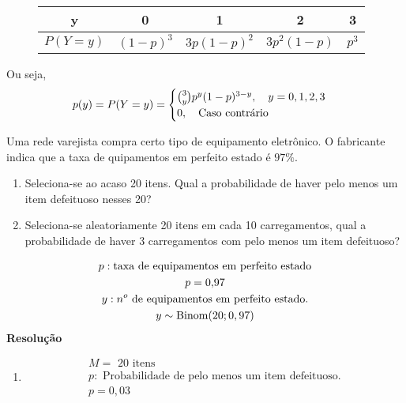 \begin{description}
\begin{example}
     \begin{figure}[H]
       \centering
       \begin{tabular}{c c c c c}
         \toprule
         y&0&1&2&3\\ \midrule
         $P(Y=y)$&$(1-p)^3$&$3p(1-p)^2$&$3p^2(1-p)$&$p^3$\\ \bottomrule
       \end{tabular}
       \label{fig:127}
     \end{figure}
      Ou seja,
      \begin{align*}
        p(y)=P(Y=y)=\begin{cases}
          \binom{3}{y}p^y (1-p)^{3-y}, \text{\quad}y=0,1,2,3\\
          0, \text{\quad Caso contrário}
        \end{cases}
      \end{align*}
    \end{example}
      \begin{example}
        Uma rede varejista compra certo tipo de equipamento eletrônico. O 
        fabricante indica que a taxa de quipamentos em perfeito estado é $97\%$.
        \begin{enumerate}[label=(\alph*)]
          \item Seleciona-se ao acaso 20 itens. Qual a probabilidade de haver pelo menos 
            um item defeituoso nesses 20?
          \item Seleciona-se aleatoriamente 20 itens em cada 10 carregamentos, qual a 
            probabilidade de haver 3 carregamentos com pelo menos um item defeituoso?
        \end{enumerate}
        \begin{gather*}
          p:\text{taxa de equipamentos em perfeito estado}\\
          p=0{,}97\\
        y:\text{$n^o$ de equipamentos em perfeito estado.}\\
       y \sim \operatorname{Binom}(20;0,97)
     \end{gather*}
        \textbf{Resolução}
        \begin{enumerate}[label=(\alph*)]
          \item
            \begin{gather*}
              M=\text{ 20 itens}\\
              p:\text{ Probabilidade de pelo menos um item defeituoso.}\\
              p=0{,}03
            \end{gather*}

\end{enumerate}
\end{example}
\end{description}
